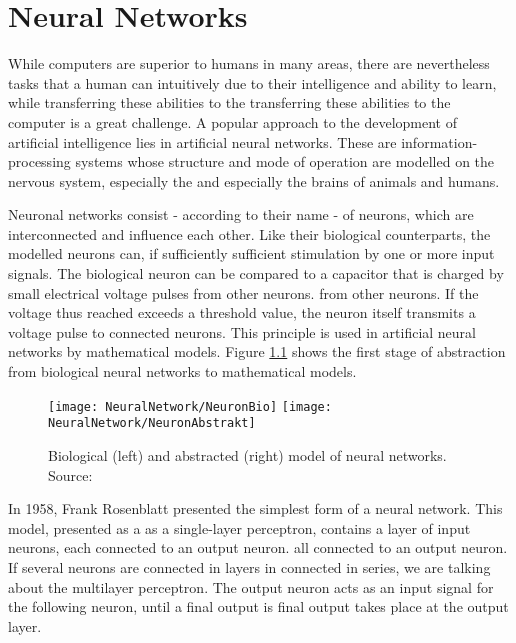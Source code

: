 %
%

\chapter{Neural Networks}

While computers are superior to humans in many areas, there are nevertheless tasks that a human can
intuitively due to their intelligence and ability to learn, while transferring these abilities to the 
transferring these abilities to the computer is a great challenge. A popular approach to the development of 
artificial intelligence lies in artificial neural networks. These are 
information-processing systems whose structure and mode of operation are modelled on the nervous system, especially the 
and especially the brains of animals and humans.

Neuronal networks consist - according to their name - of neurons, which are interconnected 
and influence each other. Like their biological counterparts, the modelled neurons can, if sufficiently 
sufficient stimulation by one or more input signals. The biological 
neuron can be compared to a capacitor that is charged by small electrical voltage pulses from other neurons. 
from other neurons. If the voltage thus reached exceeds a threshold value, 
the neuron itself transmits a voltage pulse to connected neurons. This principle is used in 
artificial neural networks by mathematical models. Figure \ref{NNBio} shows 
the first stage of abstraction from biological neural networks to mathematical models. 
\cite{Ertel:2016}

\begin{figure}[H]
	\begin{center}
		\texttt{[image: NeuralNetwork/NeuronBio]}
		\texttt{[image: NeuralNetwork/NeuronAbstrakt]}
		\caption{Biological (left) and abstracted (right) model of neural networks. Source:\cite{Ertel:2016}} 
		\label{NNBio}
	\end{center}
\end{figure}

In 1958, Frank Rosenblatt presented the simplest form of a neural network. This model, presented as a
as a single-layer perceptron, contains a layer of input neurons, each connected to an output neuron.
all connected to an output neuron. \cite{Dorn:2018} If several neurons are connected in layers in 
connected in series, we are talking about the multilayer perceptron. The output
neuron acts as an input signal for the following neuron, until a final output is
final output takes place at the output layer.

